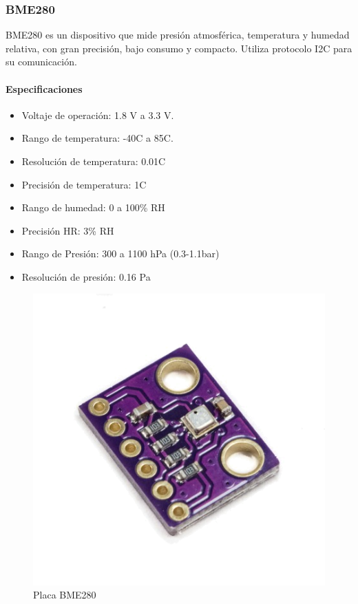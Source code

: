 	\subsubsection{BME280}
	BME280 es un dispositivo que mide presión atmosférica, temperatura y humedad relativa, con gran precisión, bajo consumo y compacto. Utiliza protocolo I2C para su comunicación.
		\paragraph*{Especificaciones}
		\begin{itemize}
		\item   Voltaje de operación: 1.8 V a 3.3 V.
		\item	Rango de temperatura: -40\grad C a 85\grad C.
		\item   Resolución de temperatura: 0.01\grad C
		\item	Precisión de temperatura: 1\grad C 
		\item	Rango de humedad: 0 a 100\% RH
		\item   Precisión HR: 3\% RH
		\item Rango de Presión: 300 a 1100 hPa (0.3-1.1bar)
		\item Resolución de presión: 0.16 Pa
	\end{itemize}
	
		\begin{figure}[htb]
		\centering
		\includegraphics[scale=0.35]{bme280.png}
		\caption{Placa BME280}
		\label{fig:BME280}
		\end{figure}
	
